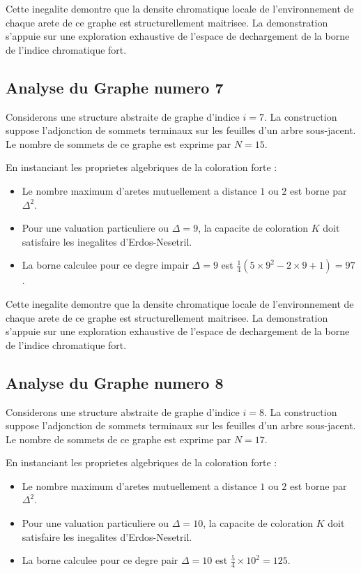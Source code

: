 \documentclass[11pt,a4paper]{article}
\begin{document}
Cette inegalite demontre que la densite chromatique locale de l'environnement de chaque arete de ce graphe est structurellement maitrisee. La demonstration s'appuie sur une exploration exhaustive de l'espace de dechargement de la borne de l'indice chromatique fort.

\subsection{Analyse du Graphe numero 7}
Considerons une structure abstraite de graphe d'indice $i = 7$. La construction suppose l'adjonction de sommets terminaux sur les feuilles d'un arbre sous-jacent. Le nombre de sommets de ce graphe est exprime par $N = 15$.

En instanciant les proprietes algebriques de la coloration forte :
\begin{itemize}
\item Le nombre maximum d'aretes mutuellement a distance $1$ ou $2$ est borne par $\Delta^2$.
\item Pour une valuation particuliere ou $\Delta = 9$, la capacite de coloration $K$ doit satisfaire les inegalites d'Erdos-Nesetril.
\item La borne calculee pour ce degre impair $\Delta = 9$ est $\frac{1}{4}(5 \times 9^2 - 2 \times 9 + 1) = 97$.
\end{itemize}

Cette inegalite demontre que la densite chromatique locale de l'environnement de chaque arete de ce graphe est structurellement maitrisee. La demonstration s'appuie sur une exploration exhaustive de l'espace de dechargement de la borne de l'indice chromatique fort.

\subsection{Analyse du Graphe numero 8}
Considerons une structure abstraite de graphe d'indice $i = 8$. La construction suppose l'adjonction de sommets terminaux sur les feuilles d'un arbre sous-jacent. Le nombre de sommets de ce graphe est exprime par $N = 17$.

En instanciant les proprietes algebriques de la coloration forte :
\begin{itemize}
\item Le nombre maximum d'aretes mutuellement a distance $1$ ou $2$ est borne par $\Delta^2$.
\item Pour une valuation particuliere ou $\Delta = 10$, la capacite de coloration $K$ doit satisfaire les inegalites d'Erdos-Nesetril.
\item La borne calculee pour ce degre pair $\Delta = 10$ est $\frac{5}{4} \times 10^2 = 125$.
\end{itemize}
\end{document}
